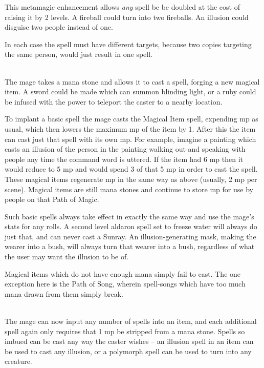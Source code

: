 \documentclass[titlepage,a4paper,openany]{book}
\begin{document}
\begin{multicols}{2}

This metamagic enhancement allows \emph{any} spell be be doubled at the cost of raising it by 2 levels.  A fireball could turn into two fireballs.  An illusion could disguise two people instead of one.

In each case the spell must have different targets, because two copies targeting the same person, would just result in one spell.

\spelllevel

\\
The mage takes a mana stone and allows it to cast a spell, forging a new magical item. A sword could be made which can summon blinding light, or a ruby could be infused with the power to teleport the caster to a nearby location.

To implant a basic spell the mage casts the Magical Item spell, expending  \gls{mp} as usual, which then lowers the maximum \gls{mp} of the item by 1. After this the item can cast just that spell with its own \gls{mp}. For example, imagine a painting which casts an illusion of the person in the painting walking out and speaking with people any time the command word is uttered. If the item had 6 \gls{mp} then it would reduce to 5 \gls{mp} and would spend 3 of that 5 \gls{mp} in order to cast the spell. These magical items regenerate \gls{mp} in the same way as above (usually, 2 \gls{mp} per scene). Magical items are still mana stones and continue to store \gls{mp} for use by people on that Path of Magic.

Such basic spells always take effect in exactly the same way and use the mage's stats for any rolls. A second level aldaron spell set to freeze water will always do just that, and can never cast a Sunray. An illusion-generating mask, making the wearer into a bush, will always turn that wearer into a bush, regardless of what the user may want the illusion to be of.

Magical items which do not have enough mana simply fail to cast. The one exception here is the Path of Song, wherein spell-songs which have too much mana drawn from them simply break.

\spelllevel

\\
The mage can now input any number of spells into an item, and each additional spell again only requires that 1 \gls{mp} be stripped from a mana stone.  Spells so imbued can be cast any way the caster wishes -- an illusion spell in an item can be used to cast any illusion, or a polymorph spell can be used to turn into any creature.


\end{multicols}
\end{document}
